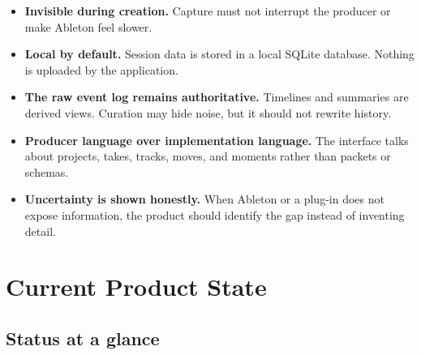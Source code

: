\documentclass[11pt,letterpaper]{article}
\begin{document}
\begin{itemize}
  \item \textbf{Invisible during creation.} Capture must not interrupt the producer
        or make Ableton feel slower.
  \item \textbf{Local by default.} Session data is stored in a local SQLite database.
        Nothing is uploaded by the application.
  \item \textbf{The raw event log remains authoritative.} Timelines and summaries are
        derived views. Curation may hide noise, but it should not rewrite history.
  \item \textbf{Producer language over implementation language.} The interface talks
        about projects, takes, tracks, moves, and moments rather than packets or schemas.
  \item \textbf{Uncertainty is shown honestly.} When Ableton or a plug-in does not
        expose information, the product should identify the gap instead of inventing detail.
\end{itemize}

\section{Current Product State}

\subsection{Status at a glance}
\end{document}

